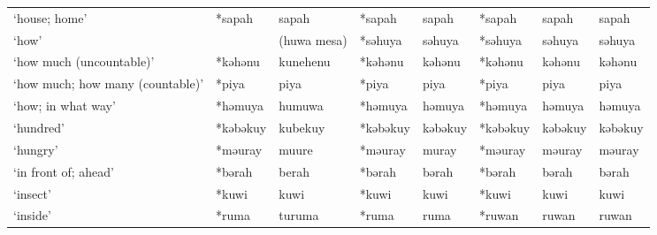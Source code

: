 \begin{landscape}
\begin{longtable}[c]{@{}p{3cm}<{\raggedright}p{2.75cm}<{\raggedright}p{2.75cm}<{\raggedright}p{2.75cm}<{\raggedright}p{2.75cm}<{\raggedright}p{2.75cm}<{\raggedright}p{2.75cm}<{\raggedright}p{2.75cm}<{\raggedright}@{}}
`house; home'                                        & *sapah             & sapah                          & *sapah             & sapah                      & *sapah           & sapah                    & sapah                             \\
`how'                                                &                    & (huwa mesa)                    & *səhuya            & səhuya                     & *səhuya          & səhuya                   & səhuya                            \\
`how much (uncountable)'                             & *kəhənu            & kunehenu                       & *kəhənu            & kəhənu                     & *kəhənu          & kəhənu                   & kəhənu                            \\
`how much; how many (countable)'                     & *piya              & piya                           & *piya              & piya                       & *piya            & piya                     & piya                              \\
`how; in what way'                                   & *həmuya            & humuwa                         & *həmuya            & həmuya                     & *həmuya          & həmuya                   & həmuya                            \\
`hundred'                                            & *kəbəkuy           & kubekuy                        & *kəbəkuy           & kəbəkuy                    & *kəbəkuy         & kəbəkuy                  & kəbəkuy                           \\
`hungry'                                             & *məuray            & muure                          & *məuray            & muray                      & *məuray          & məuray                   & məuray                            \\
`in front of; ahead'                                 & *bərah             & berah                          & *bərah             & bərah                      & *bərah           & bərah                    & bərah                             \\
`insect'                                             & *kuwi              & kuwi                           & *kuwi              & kuwi                       & *kuwi            & kuwi                     & kuwi                              \\
`inside'                                             & *ruma              & turuma                         & *ruma              & ruma                       & *ruwan           & ruwan                    & ruwan                             \\

\end{longtable}
\end{landscape}
